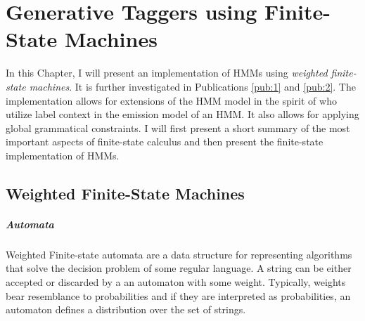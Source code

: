 \chapter{Generative Taggers using Finite-State Machines}
\label{chap:fsm}
In this Chapter, I will present an implementation of HMMs using {\it
  weighted finite-state machines}. It is further investigated in
Publications \ref{pub:1} and \ref{pub:2}. The implementation allows
for extensions of the HMM model in the spirit of \cite{Halacsy2007}
who utilize label context in the emission model of an HMM. It also
allows for applying global grammatical constraints. I will first
present a short summary of the most important aspects of finite-state
calculus and then present the finite-state implementation of HMMs.

\section{Weighted Finite-State Machines}

\paragraph{Automata} Weighted Finite-state automata are a data
structure for representing algorithms that solve the decision problem
of some regular language. A string can be either accepted or discarded
by a an automaton with some weight. Typically, weights bear
resemblance to probabilities and if they are interpreted as
probabilities, an automaton defines a distribution over the set of
strings. 


